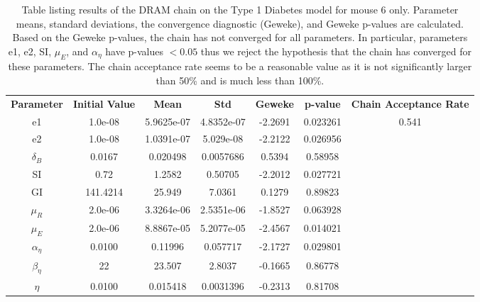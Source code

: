 \begin{table}[H]
\centering
        \begin{tabular}{c c|c c | c c ||c}
            \hline
            \textbf{Parameter} & \textbf{Initial Value} & \textbf{Mean} &  \textbf{Std} & \textbf{Geweke} & \textbf{p-value} &\textbf{Chain Acceptance Rate}\\ 
            \cline{1-7}
            e1 & 1.0e-08 & 5.9625e-07 & 4.8352e-07 & -2.2691 & 0.023261 & \multirow{10}{*}{0.541} \\
            e2 & 1.0e-08 & 1.0391e-07 &  5.029e-08 & -2.2122 & 0.026956\\
            $\delta_B$ & 0.0167 & 0.020498 &  0.0057686 &  0.5394 & 0.58958\\
            SI & 0.72 &  1.2582   &  0.50705  & -2.2012 & 0.027721\\
            GI & 141.4214 &  25.949 &  7.0361 & 0.1279 & 0.89823\\
            $\mu_R$ & 2.0e-06 & 3.3264e-06 & 2.5351e-06 & -1.8527 & 0.063928\\
            $\mu_E$ & 2.0e-06 &  8.8867e-05 & 5.2077e-05 & -2.4567 & 0.014021\\
            $\alpha_{\eta}$ & 0.0100 & 0.11996 & 0.057717 & -2.1727 & 0.029801\\
            $\beta_{\eta}$ & 22 &  23.507 & 2.8037 & -0.1665 & 0.86778\\
            $\eta$ & 0.0100 & 0.015418 &  0.0031396 & -0.2313 & 0.81708
             \\\hline
                          \hline
        \end{tabular}
    \caption{Table listing results of the DRAM chain on the Type 1 Diabetes model for mouse 6 only. Parameter means, standard deviations, the convergence diagnostic (Geweke), and Geweke p-values are calculated. Based on the Geweke p-values, the chain has not converged for all parameters. In particular, parameters e1, e2, SI,  $\mu_E$, and $\alpha_\eta$ have p-values $< 0.05$ thus we reject the hypothesis that the chain has converged for these parameters. The chain acceptance rate seems to be a reasonable value as it is not significantly larger than 50\% and is much less than 100\%.}
    \label{tab:6mcmc}
\end{table}
